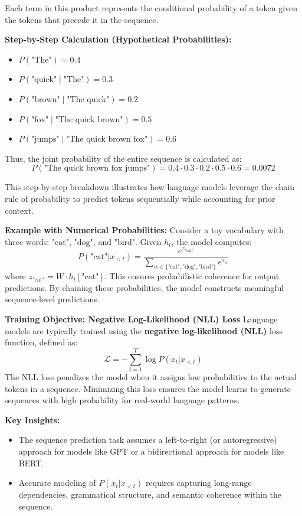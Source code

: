     Each term in this product represents the conditional probability of a token given the tokens that precede it in the sequence. 

    \textbf{Step-by-Step Calculation (Hypothetical Probabilities):}
    \begin{itemize}
        \item \(P(\text{"The"}) = 0.4\)
        \item \(P(\text{"quick"} \mid \text{"The"}) = 0.3\)
        \item \(P(\text{"brown"} \mid \text{"The quick"}) = 0.2\)
        \item \(P(\text{"fox"} \mid \text{"The quick brown"}) = 0.5\)
        \item \(P(\text{"jumps"} \mid \text{"The quick brown fox"}) = 0.6\)
    \end{itemize}

    Thus, the joint probability of the entire sequence is calculated as:
    \[
    P(\text{"The quick brown fox jumps"}) = 0.4 \cdot 0.3 \cdot 0.2 \cdot 0.5 \cdot 0.6 = 0.0072
    \]

    This step-by-step breakdown illustrates how language models leverage the chain rule of probability to predict tokens sequentially while accounting for prior context.

    \textbf{Example with Numerical Probabilities:}
    Consider a toy vocabulary with three words: \(\text{"cat"}\), \(\text{"dog"}\), and \(\text{"bird"}\). Given \(h_t\), the model computes:
    \[
    P(\text{"cat"}|x_{<t}) = \frac{e^{z_{\text{"cat"}}}}{\sum_{w \in \{\text{"cat"}, \text{"dog"}, \text{"bird"}\}} e^{z_w}}
    \]
    where \(z_{\text{"cat"}} = W \cdot h_t[\text{"cat"}]\). This ensures probabilistic coherence for output predictions. By chaining these probabilities, the model constructs meaningful sequence-level predictions. 

    \textbf{Training Objective: Negative Log-Likelihood (NLL) Loss}
    Language models are typically trained using the \textbf{negative log-likelihood (NLL)} loss function, defined as:
    \[
    \mathcal{L} = -\sum_{t=1}^T \log P(x_t | x_{<t})
    \]
    The NLL loss penalizes the model when it assigns low probabilities to the actual tokens in a sequence. Minimizing this loss ensures the model learns to generate sequences with high probability for real-world language patterns.

    \textbf{Key Insights:}
    \begin{itemize}
        \item The sequence prediction task assumes a left-to-right (or autoregressive) approach for models like GPT or a bidirectional approach for models like BERT.
        \item Accurate modeling of \(P(x_t | x_{<t})\) requires capturing long-range dependencies, grammatical structure, and semantic coherence within the sequence.
    \end{itemize}

